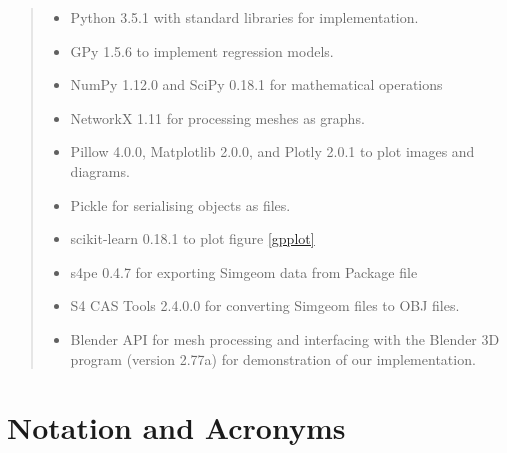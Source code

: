 \documentclass[ %
author={Dillon Keith Diep},
supervisor={Dr. Carl Henrik Ek},
degree={MEng},
title={ART-CG Hair:},
subtitle={Assisted Real-time Content Generation of Stylised Virtual Hair},
type={Research},
year={2017} ]{dissertation}
\begin{document}
\begin{quote}
	\noindent
	\begin{itemize}
		\item Python 3.5.1 with standard libraries for implementation.
		\item GPy 1.5.6 to implement regression models.
		\item NumPy 1.12.0 and SciPy 0.18.1 for mathematical operations
		\item NetworkX 1.11 for processing meshes as graphs.
		\item Pillow 4.0.0, Matplotlib 2.0.0, and Plotly 2.0.1 to plot images and diagrams.
		\item Pickle for serialising objects as files.
		\item scikit-learn 0.18.1 to plot figure \ref{gpplot}
		\item s4pe 0.4.7 for exporting Simgeom data from Package file
		\item S4 CAS Tools 2.4.0.0 for converting Simgeom files to OBJ files.
		\item Blender API for mesh processing and interfacing with the Blender 3D program (version 2.77a) for demonstration of our implementation.
	\end{itemize}
\end{quote}


\chapter*{Notation and Acronyms}
\end{document}
